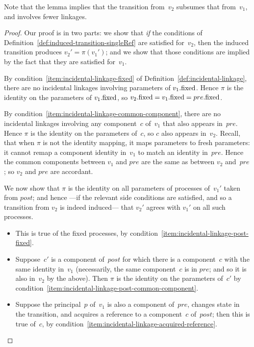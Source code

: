Note that the lemma implies that the transition from~$v_2$ subsumes that
from~$v_1$, and involves fewer linkages. 


\begin{proof}
Our proof is in two parts: we show that \emph{if} the conditions of
Definition~\ref{def:induced-transition-singleRef} are satisfied for~$v_2$,
then the induced transition produces $v_2' = \pi(v_1')$; and we show that those
conditions are implied by the fact that they are satisfied for~$v_1$.

By condition~\ref{item:incidental-linkage-fixed} of
Definition~\ref{def:incidental-linkage}, there are no incidental linkages
involving parameters of $v_1.\mathrm{fixed}$.  Hence $\pi$ is the identity on the
parameters of $v_1.\mathrm{fixed}$, so $v_2.\mathrm{fixed} = v_1.\mathrm{fixed} = pre.\mathrm{fixed}$.

By condition~\ref{item:incidental-linkage-common-component}, there are no
incidental linkages involving any component~$c$ of~$v_1$ that also appears
in~$pre$.  Hence $\pi$ is the identity on the parameters of~$c$, so $c$ also
appears in~$v_2$.  Recall, that when $\pi$ is not the identity mapping, it
maps parameters to fresh parameters: it cannot remap a component identity
in~$v_1$ to match an identity in~$pre$.  Hence the common components between
$v_1$ and $pre$ are the same as between $v_2$ and~$pre$; so $v_2$ and $pre$
are accordant.

We now show that $\pi$ is the identity on all parameters of processes
of~$v_1'$ taken from $post$; and hence ---if the relevant side conditions are
satisfied, and so a transition from $v_2$ is indeed induced--- that $v_2'$
agrees with $v_1'$ on all such processes.
%
\begin{itemize}
\item This is true of the fixed processes, by
  condition~\ref{item:incidental-linkage-post-fixed}.

\item Suppose~$c'$ is a component of~$post$ for which there is a component~$c$
  with the same identity in~$v_1$ (necessarily, the same component~$c$ is in
  $pre$; and so it is also in~$v_2$ by the above).  Then $\pi$ is the identity
  on the parameters of~$c'$ by
  condition~\ref{item:incidental-linkage-post-common-component}.

\item
Suppose the principal~$p$ of~$v_1$ is also a component of~$pre$, changes state
in the transition, and acquires a reference to a component~$c$ of~$post$; then
this is true of~$c$, by
condition~\ref{item:incidental-linkage-acquired-reference}.
\end{itemize}



\end{proof}

